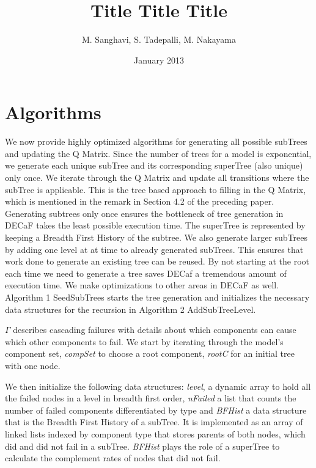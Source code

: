 \documentclass[12pt]{article}
\author{M. Sanghavi, S. Tadepalli, M. Nakayama}
\date{January 2013}
\newcommand{\VARNAME}[1]{\textrm{\it#1}}
\begin{document}
\title{Title Title Title}
\maketitle


\section{Algorithms}
\label{sec:alg}

We now provide highly optimized algorithms for generating all possible subTrees and updating the Q Matrix. Since the number of trees for a model is exponential, we generate each unique subTree and its corresponding superTree (also unique) only once. We iterate through the Q Matrix and update all transitions where the subTree is applicable. This is the tree based approach to filling in the Q Matrix, which is mentioned in the remark in Section 4.2 of the preceding paper. \cite{Iyer:2009} Generating subtrees only once ensures the bottleneck of tree generation in DECaF takes the least possible execution time. The superTree is represented by keeping a Breadth First History of the subtree. We also generate larger subTrees by adding one level at at time to already generated subTrees. This ensures that work done to generate an existing tree can be reused. By not starting at the root each time we need to generate a tree saves DECaf a tremendous amount of execution time. We make optimizations to other areas in DECaF as well. \\ 

Algorithm 1 SeedSubTrees starts the tree generation and initializes the necessary data structures for the recursion in Algorithm 2 AddSubTreeLevel. 

$\Gamma$ describes cascading failures with details about which components can cause which other components to fail. 
We start by iterating through the model's component set, \VARNAME{compSet} to choose a root component, \VARNAME{rootC} for an initial tree with one node. 

We then initialize the following data structures: \VARNAME{level}, a dynamic array to hold all the failed nodes in a level in breadth first order, \VARNAME{nFailed} a list that counts the number of failed components differentiated by type and \VARNAME{BFHist} a data structure that is the Breadth First History of a subTree. It is implemented as an array of linked lists indexed by component type that stores parents of both nodes, which did and did not fail in a subTree. \VARNAME{BFHist} plays the role of a superTree to calculate the complement rates of nodes that did not fail.
\end{document}
